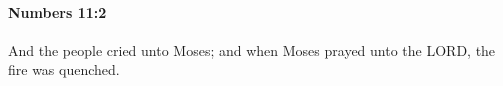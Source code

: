 
		\paragraph{Numbers 11:2} %
			\label{NUMBERS-11-2}

			And the people cried unto Moses; and when Moses prayed unto the LORD, the fire was quenched.


